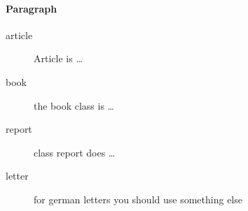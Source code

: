 \paragraph{Paragraph}
\lipsum[75]

\begin{description}
	\item[article\label{article}]{Article is \ldots}
	\item[book\label{book}]{the book class is \ldots}
	\item[report\label{report}]{class report does \ldots}
	\item[letter\label{letter}]{for german letters you should use something else}
\end{description}
	



